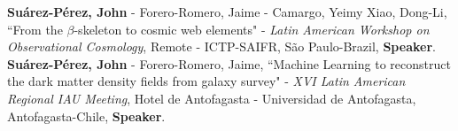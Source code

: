 \documentclass[10pt, a4paper]{article}
\newcommand{\years}[1]{\marginnote{\scriptsize #1}}
\begin{document}

\years{2020}\textbf{Suárez-Pérez, John} - Forero-Romero, Jaime - Camargo, Yeimy  Xiao, Dong-Li, “From the $\beta$-skeleton to cosmic web elements" - \emph{Latin American Workshop on Observational Cosmology}, Remote - ICTP-SAIFR, São Paulo-Brazil, \textbf{Speaker}.\\




\years{2019}\textbf{Suárez-Pérez, John} - Forero-Romero, Jaime, “Machine Learning to reconstruct the dark matter density fields from galaxy survey" - \emph{XVI Latin American Regional IAU Meeting}, Hotel de Antofagasta - Universidad de Antofagasta, Antofagasta-Chile, \textbf{Speaker}.\\


\end{document}
